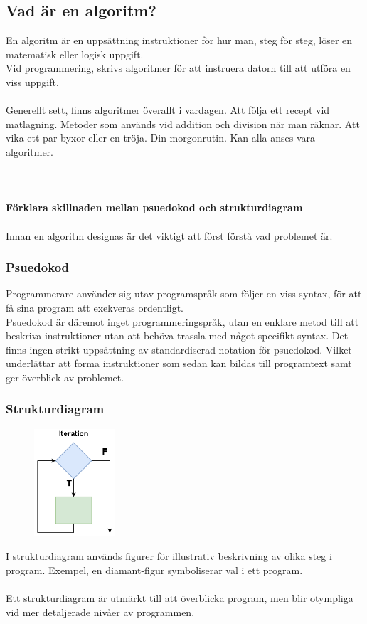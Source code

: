 \documentclass[../main.tex]{subfiles}
\begin{document}
\subsection{Vad är en algoritm?}
En algoritm är en uppsättning instruktioner för hur man, steg för steg, löser en matematisk eller logisk uppgift.\\
Vid programmering, skrivs algoritmer för att instruera datorn till att utföra en viss uppgift.\\
\\
Generellt sett, finns algoritmer överallt i vardagen.
Att följa ett recept vid matlagning. Metoder som används vid addition och division när man räknar. Att vika ett par byxor eller en tröja. Din morgonrutin. Kan alla anses vara algoritmer.\\
\\
\textbf{\textit{}}\\
\\
\textbf{Förklara skillnaden mellan psuedokod och strukturdiagram}\\
\\
Innan en algoritm designas är det viktigt att först förstå vad problemet är.
\subsubsection{Psuedokod}
Programmerare använder sig utav programspråk som följer en viss syntax, för att få sina program att exekveras ordentligt.\\
Psuedokod är däremot inget programmeringspråk, utan en enklare metod till att beskriva instruktioner utan att behöva trassla med något specifikt syntax. Det finns ingen strikt uppsättning av standardiserad notation för psuedokod. Vilket underlättar att forma instruktioner som sedan kan bildas till programtext samt ger överblick av problemet.

\newpage

\subsubsection{Strukturdiagram}
\begin{figure}
\includegraphics[width=3cm, height=4cm]{sec1/Figs/iteration.png}
\end{figure}
I strukturdiagram används figurer för illustrativ beskrivning av olika steg i program. Exempel, en diamant-figur symboliserar val i ett program.\\
\\
Ett strukturdiagram är utmärkt till att överblicka program, men blir otympliga vid mer detaljerade nivåer av programmen.
\end{document}
